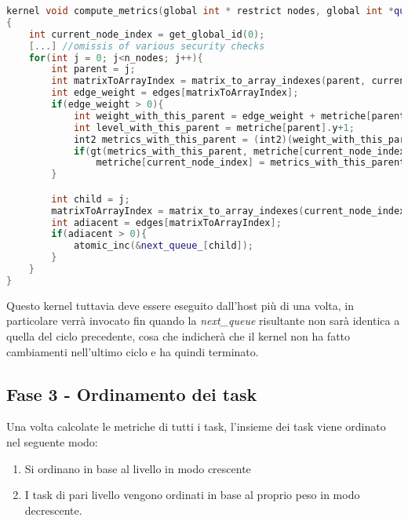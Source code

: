 \documentclass[../relazione.tex]{subfiles}
\begin{document}
\begin{lstlisting}[language=C++, caption={Compute metrics kernel},captionpos=b]
kernel void compute_metrics(global int * restrict nodes, global int *queue_, global int *next_queue_, const int n_nodes, global edge_t* restrict edges, volatile global int2 *metriche /*<RANK,LIVELLO>*/)
{
	int current_node_index = get_global_id(0);
	[...] //omissis of various security checks
	for(int j = 0; j<n_nodes; j++){
		int parent = j;
		int matrixToArrayIndex = matrix_to_array_indexes(parent, current_node_index, n_nodes);
		int edge_weight = edges[matrixToArrayIndex]; 
		if(edge_weight > 0){
			int weight_with_this_parent = edge_weight + metriche[parent].x + nodes[current_node_index];
			int level_with_this_parent = metriche[parent].y+1;
			int2 metrics_with_this_parent = (int2)(weight_with_this_parent, level_with_this_parent);
			if(gt(metrics_with_this_parent, metriche[current_node_index]))
				metriche[current_node_index] = metrics_with_this_parent;
		}

		int child = j;
		matrixToArrayIndex = matrix_to_array_indexes(current_node_index, child, n_nodes);
		int adiacent = edges[matrixToArrayIndex];
		if(adiacent > 0){
			atomic_inc(&next_queue_[child]);
		}
	}
}
\end{lstlisting}

Questo kernel tuttavia deve essere eseguito dall'host più di una volta, in particolare verrà invocato fin quando la \textit{next\_queue} risultante non sarà identica a quella del ciclo precedente, cosa che indicherà che il kernel non ha fatto cambiamenti nell'ultimo ciclo e ha quindi terminato.

\subsection{Fase 3 - Ordinamento dei task}
Una volta calcolate le metriche di tutti i task, l'insieme dei task viene ordinato nel seguente modo:
\begin{enumerate}
    \item Si ordinano in base al livello in modo crescente
    \item I task di pari livello vengono ordinati in base al proprio peso in modo decrescente.
\end{enumerate}
\end{document}
